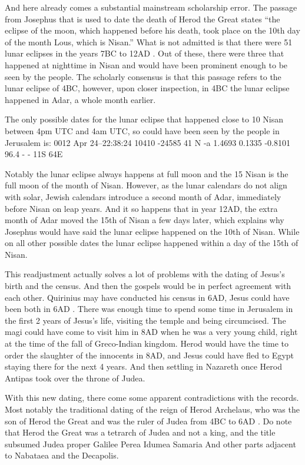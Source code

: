 And here already comes a substantial mainstream scholarship error.
The passage from Josephus that is used to date the death of Herod the Great states ``the eclipse of the moon, which happened before his death, took place on the 10th day of the month Lous, which is Nisan.'' What is not admitted is that there were 51 lunar eclipses in the years 7BC to 12AD .
Out of these, there were three that happened at nighttime in Nisan and would have been prominent enough to be seen by the people.
The scholarly consensus is that this passage refers to the lunar eclipse of 4BC, however, upon closer inspection, in 4BC the lunar eclipse happened in Adar, a whole month earlier.

The only possible dates for the lunar eclipse that happened close to 10 Nisan between 4pm UTC and 4am UTC, so could have been seen by the people in Jerusalem is: 0012 Apr 24--22:38:24 10410 -24585 41 N -a 1.4693 0.1335 -0.8101 96.4 - - 11S 64E

Notably the lunar eclipse always happens at full moon and the 15 Nisan is the full moon of the month of Nisan.
However, as the lunar calendars do not align with solar, Jewish calendars introduce a second month of Adar, immediately before Nisan on leap years.
And it so happens that in year 12AD, the extra month of Adar moved the 15th of Nisan a few days later, which explains why Josephus would have said the lunar eclipse happened on the 10th of Nisan.
While on all other possible dates the lunar eclipse happened within a day of the 15th of Nisan.

This readjustment actually solves a lot of problems with the dating of Jesus's birth and the census.
And then the gospels would be in perfect agreement with each other.
Quirinius may have conducted his census in 6AD, Jesus could have been both in 6AD .
There was enough time to spend some time in Jerusalem in the first 2 years of Jesus's life, visiting the temple and being circumcised.
The magi could have come to visit him in 8AD when he was a very young child, right at the time of the fall of Greco-Indian kingdom.
Herod would have the time to order the slaughter of the innocents in 8AD, and Jesus could have fled to Egypt staying there for the next 4 years.
And then settling in Nazareth once Herod Antipas took over the throne of Judea.

With this new dating, there come some apparent contradictions with the records.
Most notably the traditional dating of the reign of Herod Archelaus, who was the son of Herod the Great and was the ruler of Judea from 4BC to 6AD .
Do note that Herod the Great was a tetrarch of Judea and not a king, and the title subsumed Judea proper Galilee Perea Idumea Samaria And other parts adjacent to Nabataea and the Decapolis.

